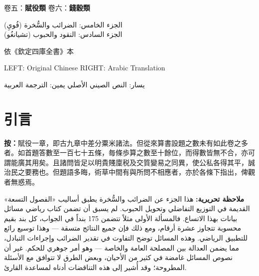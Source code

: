 \documentclass[11pt,a4paper]{article}
\newcommand{\ChinCol}[1]{\begin{minipage}[t]{0.48\textwidth}#1\end{minipage}}
\newcommand{\ArabCol}[1]{\begin{minipage}[t]{0.48\textwidth}\arabicfont\beginR #1\endR\end{minipage}}
\newcommand{\parallelsection}[2]{%
  \noindent\ChinCol{#1}\hfill\ArabCol{#2}\par\vspace{0.5cm}%
}
\begin{document}
\begin{titlepage}
\begin{center}
\vspace{1.5cm}

{\small\color{notecolor} 卷五：\textbf{賦役類} \textbar{} 卷六：\textbf{錢穀類}}

\vspace{0.3cm}

{\small\arabicfont\beginR\color{notecolor}
الجزء الخامس: الضرائب والسُّخرة (فُويِ)\\
الجزء السادس: النقود والحبوب (تشيانغُو)
\endR}

\vfill

{\small 依《欽定四庫全書》本}

\vspace{0.2cm}

{\small\color{notecolor}
LEFT: Original Chinese \quad\textbar\quad RIGHT: Arabic Translation}

\vspace{0.2cm}

{\small\arabicfont\beginR\color{notecolor}
يسار: النص الصيني الأصلي \quad\textbar\quad يمين: الترجمة العربية
\endR}

\end{center}
\end{titlepage}

\tableofcontents
\newpage

\section*{引言}

\parallelsection{%
\textbf{按：}賦役一章，即古九章中差分粟米諸法。但從來算書設題之數未有如此卷之多者。如首題答數至一百七十五條，毎條歩算之數至十餘位，而得數皆無不合，亦可謂能廣其用矣。且諸問皆足以明貴賤廩税及交質變易之同異，使公私各得其平，誠治民之要務也。但題語多晦，術草中間有與所問不相應者，亦於各條下指出，俾觀者無惑焉。%
}{%
\textbf{ملاحظة تحريرية:} هذا الجزء عن الضرائب والسُّخرة يطبق أساليب «الفصول التسعة» القديمة في التوزيع التفاضلي وتحويل الحبوب. لم يسبق أن تضمن كتاب رياضي مسائل بيانات بهذا الاتساع. فالمسألة الأولى مثلاً تتضمن 175 بنداً في الجواب، كل بند بقيم محسوبة تتجاوز عشرة أرقام، ومع ذلك فإن جميع النتائج متسقة --- وهذا توسيع رائع للتطبيق الرياضي. وهذه المسائل توضح التفاوت في تقدير الضرائب وإجراءات التبادل، مما يضمن العدالة بين المصلحة العامة والخاصة --- وهو أمر جوهري للحكم. غير أن نصوص المسائل غامضة في كثير من الأحيان، وبعض الطرق لا تتوافق مع الأسئلة المطروحة؛ وقد أُشير إلى هذه التناقضات أدناه لمساعدة القارئ.%
}
\end{document}
